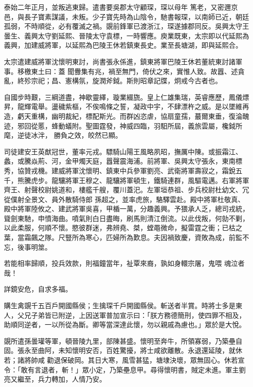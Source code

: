 \begin{pinyinscope}
 泰始二年正月，並叛逃東歸。遣書要吳郡太守顧琛，琛以母年
 篤老，又密邇京邑，與長子寶素謀議，未叛。少子寶先時為山陰令，馳書報琛，以南師已近，朝廷孤弱，不時順從，必有覆滅之禍。覬前鋒軍已渡浙江，琛遂據郡同反。吳興太守王曇生、義興太守劉延熙、晉陵太守袁標，一時響應。庾業既東，太宗即以代延熙為義興，加建威將軍，以延熙為巴陵王休若鎮東長史。業至長塘湖，即與延熙合。



 太宗遣建威將軍沈懷明東討，尚書張永係進，鎮東將軍巴陵王休若董統東討諸軍事。移檄東土曰：蓋
 聞釁集有兆，禍至無門，倚伏之來，實惟人致。故囂、述貪亂，終殄宗祀；昌、憲構氛，旋潤斧鉞。斯則昭章記牒，炯戒今古者也。



 自國步時艱，三綱道盡，神歇靈繹，璇業綴旒。皇上仁雄集瑞，英睿應歷，鳳儀熛昇，龍輝電舉。盪穢紫樞，不俟鳴條之誓，凝政中宇，不肆漂杵之威。是以墜維再造，虧天重構，幽明裁紀，標配斯光。而群凶恣虐，協扇童孺，蕞爾東垂，復淪醜迹，邪回從慝，蜂動蟻附。聖圖霆發，神威四臨，羽馹所屆，義旅雲屬，欃鉞所麾，逆徒冰泮，
 勝負之效，皎然已顯。



 司徒建安王英猷冠世，董率元戎。驃騎山陽王風略夙昭，撫厲中陳。或振霜江、蠡，或騰焱荊、河，金甲燭天庭，囂聲震海浦。前將軍、吳興太守張永，東南標秀，協贊戎機。建威將軍沈懷明、鎮東中兵參軍劉亮、武衛將軍壽寂之，霜銳五千，熊騰虎步。龍驤將軍王穆之、龍驤將軍頓生，鐵騎連群，風驅電邁。右軍將軍齊王、射聲校尉姚道和，樓艦千艘，覆川蓋汜。左軍垣恭祖、步兵校尉杜幼文、冗從僕射全景文、員外散騎侍郎
 孫超之，並率虎旅，駱驛雲赴。殿中將軍杜敬真、殿中將軍陸攸之、建武將軍吳喜，甲楯一萬，分趣義興。予猥承人乏，總司戎統，聳劍東馳，申憤海曲。噴氣則白日盡晦，刷馬則清江倒流。以此伐叛，何勍不剿，以此柔服，何順不懷。愍彼群迷，弗辨堯、桀，螳黽微命，擬雷霆之衝；已枯之葉，當霜飆之隊。尺豎所為寒心，匹婦所為歎息。夫因禍致慶，資敗為成，前監不忘，後事明筮。



 若能相率歸順，投兵效款，則福鐘當年，祉覃來裔，孰如身轘宗屠，鬼喂
 魂泣者哉！



 詳鏡安危，自求多福。



 購生禽覬千五百戶開國縣侯；生擒琛千戶開國縣侯。斬送者半賞。時將士多是東人，父兄子弟皆已附逆，上因送軍普加宣示曰：「朕方務德簡刑，使四罪不相及，助順同逆者，一以所從為斷。卿等當深達此懷，勿以親戚為慮也。」眾於是大悅。



 覬所遣孫曇瓘等軍，頓晉陵九里，部陳甚盛。懷明至奔牛，所領寡弱，乃築壘自固。張永至曲阿，未知懷明安否，百姓驚擾，將士咸欲離散。永退還延陵，就休若；諸將帥咸
 勸退保破岡。其日大寒，風雪甚猛，塘埭決壞，眾無固心。休若宣令：「敢有言退者，斬！」眾小定，乃築壘息甲。尋得懷明書，賊定未進。軍主劉亮又繼至，兵力轉加，人情乃安。




\end{pinyinscope}
